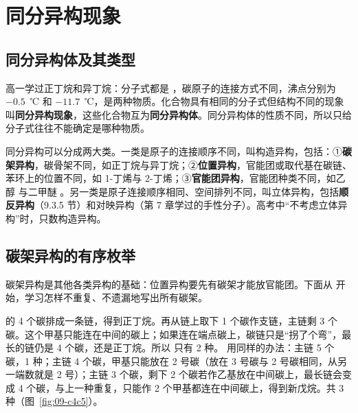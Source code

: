 \documentclass[UTF8,a4paper,zihao=5,oneside,openany,fontset=none]{ctexbook}
\begin{document}
\section{同分异构现象}

\subsection{同分异构体及其类型}
高一学过正丁烷和异丁烷：分子式都是 ，碳原子的连接方式不同，沸点分别为 $-0.5$~℃ 和 $-11.7$~℃，是两种物质。化合物具有相同的分子式但结构不同的现象叫\textbf{同分异构现象}，这些化合物互为\textbf{同分异构体}。同分异构体的性质不同，所以只给分子式往往不能确定是哪种物质。

同分异构可以分成两大类。一类是原子的连接顺序不同，叫构造异构，包括：①\textbf{碳架异构}，碳骨架不同，如正丁烷与异丁烷；②\textbf{位置异构}，官能团或取代基在碳链、苯环上的位置不同，如 1-丁烯与 2-丁烯；③\textbf{官能团异构}，官能团种类不同，如乙醇  与二甲醚 。另一类是原子连接顺序相同、空间排列不同，叫立体异构，包括\textbf{顺反异构}（9.3.5 节）和对映异构（第 7 章学过的手性分子）。高考中“不考虑立体异构”时，只数构造异构。

\subsection{碳架异构的有序枚举}
碳架异构是其他各类异构的基础：位置异构要先有碳架才能放官能团。下面从  开始，学习怎样不重复、不遗漏地写出所有碳架。

 的 4 个碳排成一条链，得到正丁烷。再从链上取下 1 个碳作支链，主链剩 3 个碳。这个甲基只能连在中间的碳上；如果连在端点碳上，碳链只是“拐了个弯”，最长的链仍是 4 个碳，还是正丁烷。所以  只有 2 种。 用同样的办法：主链 5 个碳，1 种；主链 4 个碳，甲基只能放在 2 号碳（放在 3 号碳与 2 号碳相同，从另一端数就是 2 号）；主链 3 个碳，剩下 2 个碳若作乙基放在中间碳上，最长链会变成 4 个碳，与上一种重复，只能作 2 个甲基都连在中间碳上，得到新戊烷。共 3 种（图~\ref{fig:09-c4c5}）。
\end{document}
